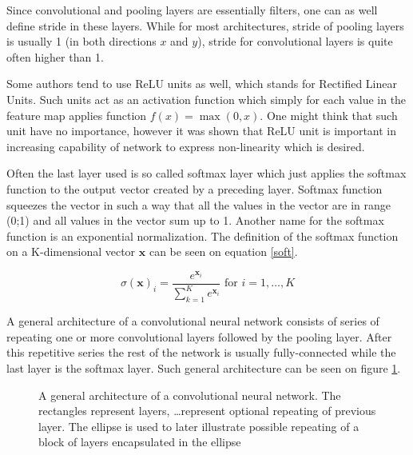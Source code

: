 Since convolutional and pooling layers are essentially filters, one can as well define stride in these layers. While for most architectures, stride of pooling layers is usually 1 (in both directions $x$ and $y$), stride for convolutional layers is quite often higher than 1.

Some authors tend to use ReLU units as well, which stands for Rectified Linear Units. Such units act as an activation function which simply for each value in the feature map applies function $f(x) = \max(0,x)$. One might think that such unit have no importance, however it was shown that ReLU unit is important in increasing capability of network to express non-linearity which is desired.

Often the last layer used is so called softmax layer which just applies the softmax function to the output vector created by a preceding layer. Softmax function squeezes the vector in such a way that all the values in the vector are in range (0;1) and all values in the vector sum up to 1. Another name for the softmax function is an exponential normalization. The definition of the softmax function on a K-dimensional vector $\textbf{x}$ can be seen on equation \ref{soft}.

\begin{equation}
\sigma(\textbf{x})_i = \frac{e^{\textbf{x}_i}}{\sum_{k=1}^K e^{\textbf{x}_i}} \text{ for } i = 1,\dots,K
\label{soft}
\end{equation}

A general architecture of a convolutional neural network consists of series of repeating one or more convolutional layers followed by the pooling layer. After this repetitive series the rest of the network is usually fully-connected while the last layer is the softmax layer. Such general architecture can be seen on figure \ref{conv}.

\begin{figure}
\caption[A general architecture of a convolutional neural network]{A general architecture of a convolutional neural network. The rectangles represent layers, \ldots represent optional repeating of previous layer. The ellipse is used to later illustrate possible repeating of a block of layers encapsulated in the ellipse}
\label{conv}
\end{figure}


